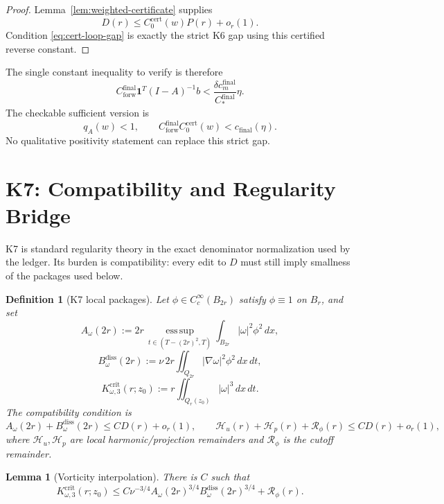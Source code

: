 \documentclass[11pt]{article}
\newtheorem{definition}{Definition}
\newtheorem{lemma}{Lemma}
\begin{document}
\begin{proof}
Lemma~\ref{lem:weighted-certificate} supplies
\[
D(r)\le C_0^{\mathrm{cert}}(w)P(r)+o_r(1).
\]
Condition \eqref{eq:cert-loop-gap} is exactly the strict K6 gap using this
certified reverse constant.
\end{proof}

The single constant inequality to verify is therefore
\begin{equation}
\label{eq:single-ledger}
C_{\mathrm{forw}}^{\mathrm{final}}\mathbf 1^T(I-A)^{-1}b
<
\frac{\delta c_m^{\mathrm{final}}}{C_*^{\mathrm{final}}}\eta.
\end{equation}
The checkable sufficient version is
\[
q_A(w)<1,
\qquad
C_{\mathrm{forw}}^{\mathrm{final}}C_0^{\mathrm{cert}}(w)
<
c_{\mathrm{final}}(\eta).
\]
No qualitative positivity statement can replace this strict gap.

\clearpage
\section{K7: Compatibility and Regularity Bridge}
\label{sec:K7}

K7 is standard regularity theory in the exact denominator normalization used by
the ledger.  Its burden is compatibility: every edit to \(D\) must still imply
smallness of the packages used below.

\begin{definition}[K7 local packages]
\label{def:K7-packages}
Let \(\phi\in C_c^\infty(B_{2r})\) satisfy \(\phi\equiv1\) on \(B_r\), and set
\[
A_\omega(2r)
:=
2r\,\operatorname*{ess\,sup}_{t\in(T-(2r)^2,T)}
\int_{B_{2r}}|\omega|^2\phi^2\,dx,
\]
\[
B_\omega^{\mathrm{diss}}(2r)
:=
\nu\,2r\iint_{Q_{2r}}|\nabla\omega|^2\phi^2\,dx\,dt,
\]
\[
K_{\omega,3}^{\mathrm{crit}}(r;z_0)
:=
r\iint_{Q_r(z_0)}|\omega|^3\,dx\,dt.
\]
The compatibility condition is
\begin{equation}
\label{eq:K7-compat}
A_\omega(2r)+B_\omega^{\mathrm{diss}}(2r)
\le CD(r)+o_r(1),
\qquad
\mathcal H_u(r)+\mathcal H_p(r)+\mathcal R_\phi(r)
\le CD(r)+o_r(1),
\end{equation}
where \(\mathcal H_u,\mathcal H_p\) are local harmonic/projection remainders
and \(\mathcal R_\phi\) is the cutoff remainder.
\end{definition}

\begin{lemma}[Vorticity interpolation]
\label{lem:vort-interp}
There is \(C\) such that
\begin{equation}
\label{eq:vort-interp}
K_{\omega,3}^{\mathrm{crit}}(r;z_0)
\le
C\nu^{-3/4}
A_\omega(2r)^{3/4}B_\omega^{\mathrm{diss}}(2r)^{3/4}
+\mathcal R_\phi(r).
\end{equation}
\end{lemma}
\end{document}
